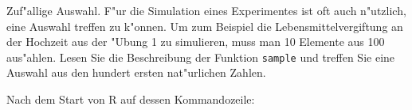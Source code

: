 Zuf"allige Auswahl. F"ur die Simulation eines Experimentes ist oft
auch n"utzlich, eine Auswahl treffen zu k"onnen. Um zum Beispiel die
Lebensmittelvergiftung an der Hochzeit aus der "Ubung 1 zu simulieren,
muss man 10 Elemente aus 100 aus"ahlen. Lesen Sie die Beschreibung
der Funktion {\tt sample} und treffen Sie eine Auswahl aus den hundert
ersten nat"urlichen Zahlen.

\begin{loesung}
Nach dem Start von R auf dessen Kommandozeile:
\end{loesung}

